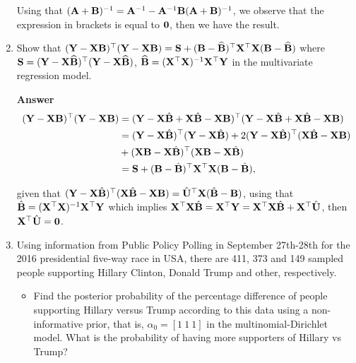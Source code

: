 \begin{enumerate}[leftmargin=*]
Using that $({\bf{A}}+{\bf{B}})^{-1}={\bf{A}}^{-1}-{\bf{A}}^{-1}{\bf{B}}({\bf{A}}+{\bf{B}})^{-1}$, we observe that the expression in brackets is equal to ${\bf{0}}$, then we have the result.

\item Show that $({\bf{Y}}-{\bf{X}}{\bf{B}})^{\top}({\bf{Y}}-{\bf{X}}{\bf{B}})={\bf{S}}+({\bf{B}}-\widehat{\bf{B}})^{\top}{\bf{X}}^{\top}{\bf{X}}({\bf{B}}-\widehat{\bf{B}})$ where ${\bf{S}}= ({\bf{Y}}-{\bf{X}}\widehat{\bf{B}})^{\top}({\bf{Y}}-{\bf{X}}\widehat{\bf{B}})$, $\widehat{\bf{B}}= ({\bf{X}}^{\top}{\bf{X}})^{-1}{\bf{X}}^{\top}{\bf{Y}}$ in the multivariate regression model.

\textbf{Answer}
\begin{align*}
	({\bf{Y}}-{\bf{X}}{\bf{B}})^{\top}({\bf{Y}}-{\bf{X}}{\bf{B}})&=({\bf{Y}}-{\bf{X}}\hat{{\bf{B}}}+{\bf{X}}\hat{{\bf{B}}}-{\bf{X}}{\bf{B}})^{\top}({\bf{Y}}-{\bf{X}}\hat{{\bf{B}}}+{\bf{X}}\hat{{\bf{B}}}-{\bf{X}}{\bf{B}})\\
	&=({\bf{Y}}-{\bf{X}}\hat{{\bf{B}}})^{\top}({\bf{Y}}-{\bf{X}}\hat{{\bf{B}}})+2({\bf{Y}}-{\bf{X}}\hat{{\bf{B}}})^{\top}({\bf{X}}\hat{{\bf{B}}}-{\bf{X}}{\bf{B}})\\
	&+({\bf{X}}{\bf{B}}-{\bf{X}}\hat{{\bf{B}}})^{\top}({\bf{X}}{\bf{B}}-{\bf{X}}\hat{{\bf{B}}})\\
	&={\bf{S}}+({\bf{B}}-\hat{{\bf{B}}})^{\top}{\bf{X}}^{\top}{\bf{X}}({\bf{B}}-\hat{{\bf{B}}}),
\end{align*}

given that $({\bf{Y}}-{\bf{X}}\hat{{\bf{B}}})^{\top}({\bf{X}}\hat{{\bf{B}}}-{\bf{X}}{\bf{B}})=\hat{\bf{U}}^{\top}{\bf{X}}(\hat{{\bf{B}}}-{\bf{B}})$, using that $\hat{{\bf{B}}}=({\bf{X}}^{\top}{\bf{X}})^{-1}{\bf{X}}^{\top}{\bf{Y}}$ which implies ${\bf{X}}^{\top}{\bf{X}}\hat{{\bf{B}}}={\bf{X}}^{\top}{\bf{Y}}={\bf{X}}^{\top}{\bf{X}}\hat{\bf{B}}+{\bf{X}}^{\top}\hat{\bf{U}}$, then ${\bf{X}}^{\top}\hat{\bf{U}}={\bf{0}}$.

	\item Using information from Public Policy Polling in September 27th-28th for the 2016 presidential five-way race in USA, there are 411, 373 and 149 sampled people supporting Hillary Clinton, Donald Trump and other, respectively. 

\begin{itemize}
	\item Find the posterior probability of the percentage difference of people supporting Hillary versus Trump according to this data using a non-informative prior, that is, $\alpha_0=[1 \ 1 \ 1]$ in the multinomial-Dirichlet model. What is the probability of having more supporters of Hillary vs Trump?
	

\end{itemize}
\end{enumerate}

